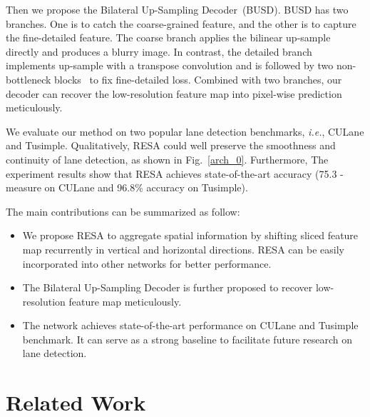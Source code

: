 \documentclass[letterpaper]{article} \usepackage{aaai21}  \usepackage{times}  \usepackage{helvet} \usepackage{courier}  \usepackage[hyphens]{url}  \usepackage{graphicx} \urlstyle{rm} \def\UrlFont{\rm}  \usepackage{natbib}  \usepackage{caption} \frenchspacing  \setlength{\pdfpagewidth}{8.5in}  \setlength{\pdfpageheight}{11in}  \usepackage{amsmath}
\begin{document}
Then we propose the Bilateral Up-Sampling Decoder~(BUSD). BUSD has two branches. One is to catch the coarse-grained feature, and the other is to capture the fine-detailed feature. The coarse branch applies the bilinear up-sample directly and produces a blurry image. In contrast, the detailed branch implements up-sample with a transpose convolution and is followed by two non-bottleneck blocks~\citep{romera2017erfnet} to fix fine-detailed loss. Combined with two branches, our decoder can recover the low-resolution feature map into pixel-wise prediction meticulously.

We evaluate our method on two popular lane detection benchmarks, \emph{i.e.}, CULane and Tusimple. Qualitatively, RESA could well preserve the smoothness and continuity of lane detection, as shown in  Fig.~\ref{arch_0}. Furthermore, The experiment results show that RESA achieves state-of-the-art accuracy (75.3 -measure on CULane and 96.8\% accuracy on Tusimple).


The main contributions can be summarized as follow:
\begin{itemize}
\item  We propose RESA to aggregate spatial information by shifting sliced feature map recurrently in vertical and horizontal directions. RESA can be easily incorporated into other networks for better performance.
\item The Bilateral Up-Sampling Decoder is further proposed to recover low-resolution feature map meticulously.
\item The network achieves state-of-the-art performance on CULane and Tusimple benchmark. It can serve as a strong baseline to facilitate future research on lane detection.
\end{itemize}


\section{Related Work}
\end{document}
